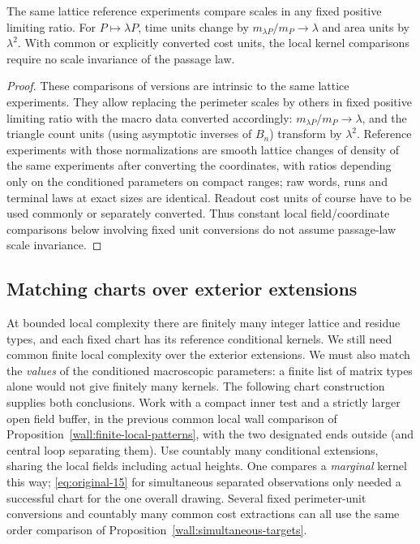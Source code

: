 \begin{lemma}\label{kern:unit-conversion}
The same lattice reference experiments compare scales in any fixed positive limiting ratio.
For \(P\mapsto\lambda P\), time units change by \(m_{\lambda P}/m_P\to\lambda\) and area
units by \(\lambda^2\). With common or explicitly converted cost units, the local kernel
comparisons require no scale invariance of the passage law.
\end{lemma}
\begin{proof}

These comparisons of versions are intrinsic to the same lattice experiments. They allow replacing the
perimeter scales by others in fixed positive limiting ratio with the macro data converted accordingly:
\(m_{\lambda P}/m_P\to\lambda \), and the triangle count units (using asymptotic inverses of \(B_n\))
transform by \(\lambda ^2\). Reference experiments with those normalizations are smooth lattice changes of
density of the same experiments after converting the coordinates, with ratios depending only on the
conditioned parameters on compact ranges; raw words, runs and terminal laws at exact sizes are identical.
Readout cost units of course have to be used commonly or separately converted. Thus constant local
field/coordinate comparisons below involving fixed unit conversions do not assume passage-law scale
invariance.

\end{proof}

\subsection{Matching charts over exterior extensions}

At bounded local complexity there are finitely many integer lattice and residue
types, and each fixed chart has its reference conditional kernels. We still need
common finite local complexity over the exterior extensions. We must also match
the \emph{values} of the conditioned macroscopic parameters: a finite list of
matrix types alone would not give finitely many kernels. The following chart
construction supplies both conclusions. Work with a compact inner test and a strictly larger open field buffer, in the previous
common local wall comparison of Proposition~\ref{wall:finite-local-patterns}, with the two designated ends outside (and central loop separating them). Use
countably many conditional extensions, sharing the local fields including actual heights. One compares a
\emph{marginal} kernel this way; \eqref{eq:original-15} for simultaneous separated observations only needed
a successful chart for the one overall drawing. Several fixed perimeter-unit conversions and countably many
common cost extractions can all use the same order comparison of Proposition~\ref{wall:simultaneous-targets}.

